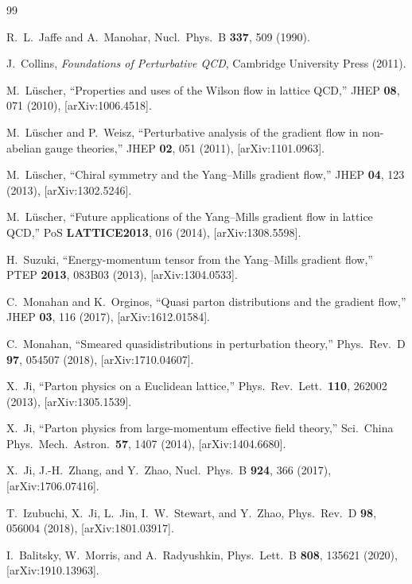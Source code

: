 \documentclass[12pt,a4paper]{ctexart}
\theoremstyle{definition}
\begin{document}
\begin{thebibliography}{99}

R.~L.~Jaffe and A.~Manohar,
Nucl.\ Phys.\ B \textbf{337}, 509 (1990).

J.~Collins,
\textit{Foundations of Perturbative QCD},
Cambridge University Press (2011).

M.~L\"uscher,
``Properties and uses of the Wilson flow in lattice QCD,''
JHEP \textbf{08}, 071 (2010), [arXiv:1006.4518].

M.~L\"uscher and P.~Weisz,
``Perturbative analysis of the gradient flow in non-abelian gauge theories,''
JHEP \textbf{02}, 051 (2011), [arXiv:1101.0963].

M.~L\"uscher,
``Chiral symmetry and the Yang--Mills gradient flow,''
JHEP \textbf{04}, 123 (2013), [arXiv:1302.5246].

M.~L\"uscher,
``Future applications of the Yang--Mills gradient flow in lattice QCD,''
PoS \textbf{LATTICE2013}, 016 (2014), [arXiv:1308.5598].

H.~Suzuki,
``Energy-momentum tensor from the Yang--Mills gradient flow,''
PTEP \textbf{2013}, 083B03 (2013), [arXiv:1304.0533].

C.~Monahan and K.~Orginos,
``Quasi parton distributions and the gradient flow,''
JHEP \textbf{03}, 116 (2017), [arXiv:1612.01584].

C.~Monahan,
``Smeared quasidistributions in perturbation theory,''
Phys.\ Rev.\ D \textbf{97}, 054507 (2018), [arXiv:1710.04607].

X.~Ji,
``Parton physics on a Euclidean lattice,''
Phys.\ Rev.\ Lett.\ \textbf{110}, 262002 (2013), [arXiv:1305.1539].

X.~Ji,
``Parton physics from large-momentum effective field theory,''
Sci.\ China Phys.\ Mech.\ Astron.\ \textbf{57}, 1407 (2014), [arXiv:1404.6680].

X.~Ji, J.-H.~Zhang, and Y.~Zhao,
Nucl.\ Phys.\ B \textbf{924}, 366 (2017), [arXiv:1706.07416].

T.~Izubuchi, X.~Ji, L.~Jin, I.~W.~Stewart, and Y.~Zhao,
Phys.\ Rev.\ D \textbf{98}, 056004 (2018), [arXiv:1801.03917].

I.~Balitsky, W.~Morris, and A.~Radyushkin,
Phys.\ Lett.\ B \textbf{808}, 135621 (2020), [arXiv:1910.13963].


\end{thebibliography}
\end{document}
